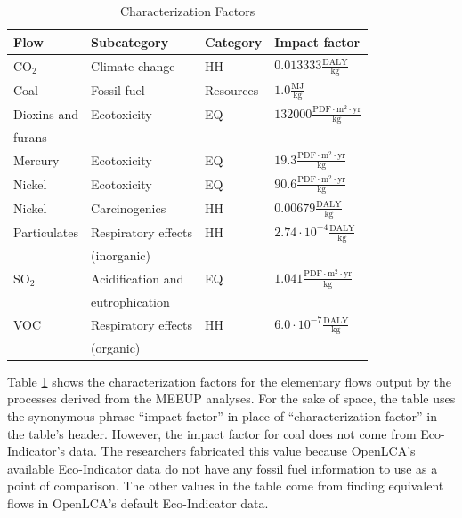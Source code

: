 \documentclass[final,journal,10pt,letterpaper,oneside,twocolumn,compsoc]%
{IEEEtran}
\begin{document}
\begin{table}[t!]
  \caption{Characterization Factors}
  \label{tab:8}
  \centering
    \begin{tabular}{| l | l | l | l |}
      \hline
      Flow & Subcategory & Category & Impact factor \\
      \hline
      CO$_2$   & Climate change  & HH      & 
        $0.013333 \frac{\textrm{DALY}}{\textrm{kg}}$ \\
      Coal & Fossil fuel     & Resources          &
        $1.0 \frac{\textrm{MJ}}{\textrm{kg}}$ \\
      Dioxins and & Ecotoxicity & EQ & $132000 \frac{\textrm{
        PDF} \cdot \textrm{m}^2 \cdot \textrm{yr}}{\textrm{kg}}$ \\
        \hspace{5mm} furans & & &  \\
      Mercury & Ecotoxicity & EQ & $19.3 \frac{\textrm{PDF} \cdot
        \textrm{m}^2 \cdot \textrm{yr}}{\textrm{kg}}$ \\
      Nickel  & Ecotoxicity & EQ & $90.6 \frac{\textrm{PDF} \cdot
        \textrm{m}^2 \cdot \textrm{yr}}{\textrm{kg}}$ \\
      Nickel  & Carcinogenics & HH &
        $0.00679 \frac{\textrm{DALY}}{\textrm{kg}}$ \\
      Particulates & Respiratory effects      & HH &
        $2.74 \cdot 10^{-4} \frac{\textrm{DALY}}{\textrm{kg}}$ \\
                   & \hspace{5mm} (inorganic) &              &  \\
      SO$_2$ & Acidification and & EQ & $1.041 \frac{
        \textrm{PDF} \cdot \textrm{m}^2 \cdot \textrm{yr}}{\textrm{kg}}$ \\
                     & \hspace{5mm} eutrophication & & \\
      VOC & Respiratory effects & HH &
        $6.0 \cdot 10^{-7} \frac{\textrm{DALY}}{\textrm{kg}}$ \\
          & \hspace{5mm} (organic) & &  \\
      \hline
    \end{tabular}
\end{table}

Table \ref{tab:8} shows the characterization factors for the elementary
flows output by the
processes derived from the MEEUP analyses. For the sake of space, the table uses
the synonymous phrase ``impact factor'' in place of ``characterization factor''
in the table's header. However, the impact factor for coal does not come
from Eco-Indicator's data. The
researchers fabricated this value because OpenLCA's
available Eco-Indicator data do
not have any fossil fuel information to use as a point of comparison. The other
values in
the table come from finding equivalent flows in OpenLCA's default Eco-Indicator
data.
\end{document}
